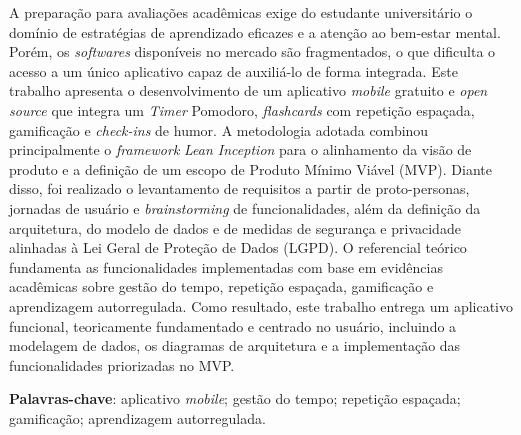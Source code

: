 \begin{resumo}

A preparação para avaliações acadêmicas exige do estudante universitário o domínio de estratégias de aprendizado eficazes e a atenção ao bem-estar mental. Porém, os \textit{softwares} disponíveis no mercado são fragmentados, o que dificulta o acesso a um único aplicativo capaz de auxiliá-lo de forma integrada. Este trabalho apresenta o desenvolvimento de um aplicativo \textit{mobile} gratuito e \textit{open source} que integra um \textit{Timer} Pomodoro, \textit{flashcards} com repetição espaçada, gamificação e \textit{check-ins} de humor. A metodologia adotada combinou principalmente o \textit{framework} \textit{Lean Inception} para o alinhamento da visão de produto e a definição de um escopo de Produto Mínimo Viável (MVP). Diante disso, foi realizado o levantamento de requisitos a partir de proto-personas, jornadas de usuário e \textit{brainstorming} de funcionalidades, além da definição da arquitetura, do modelo de dados e de medidas de segurança e privacidade alinhadas à Lei Geral de Proteção de Dados (LGPD). O referencial teórico fundamenta as funcionalidades implementadas com base em evidências acadêmicas sobre gestão do tempo, repetição espaçada, gamificação e aprendizagem autorregulada. Como resultado, este trabalho entrega um aplicativo funcional, teoricamente fundamentado e centrado no usuário, incluindo a modelagem de dados, os diagramas de arquitetura e a implementação das funcionalidades priorizadas no MVP.

 \vspace{\onelineskip}

 \noindent
 \textbf{Palavras-chave}: aplicativo \textit{mobile}; gestão do tempo; repetição espaçada; gamificação; aprendizagem autorregulada.
\end{resumo}
